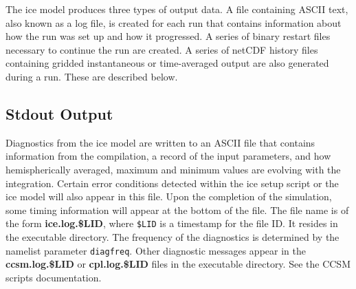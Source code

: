 
The ice model produces three types of output data.  A file containing
ASCII text, also known as a log file, is created for each run that
contains information about how the run was set up and how it progressed.
A series of binary restart files necessary to continue the run are created.
A series of netCDF history files containing gridded instantaneous or
time-averaged output are also generated during a run.  These are described below. 


\subsection{Stdout Output}
\label{stdout}

Diagnostics from the ice model are written to an ASCII file that contains
information from the compilation, a record
of the input parameters, and how hemispherically averaged, maximum and minimum
values are evolving with the integration.  Certain error conditions detected
within the ice setup script or the ice model will also appear in this file.
Upon the completion of the simulation, some timing information will appear
at the bottom of the file.
The file name is of the form {\bf ice.log.\$LID}, where \texttt{\$LID} is
a timestamp for the file ID. It resides in the executable directory.
The frequency of the diagnostics is determined by the namelist parameter
\texttt{diagfreq}. Other diagnostic messages appear in the {\bf ccsm.log.\$LID}
or {\bf cpl.log.\$LID} files in the executable directory. See the CCSM scripts
documentation.

